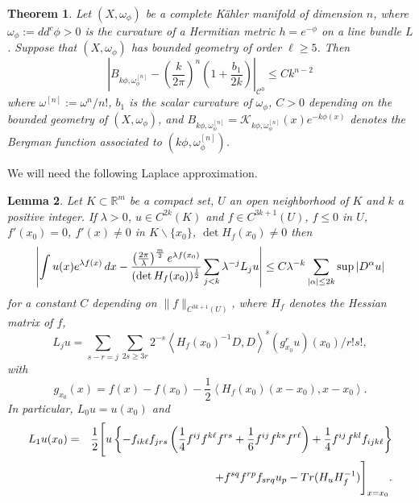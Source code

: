 \documentclass[a4paper, 11pt]{amsart}
\theoremstyle{plain}
\newtheorem{theorem}{Theorem}[section]
\numberwithin{equation}{section} %
\numberwithin{figure}{section} %
\theoremstyle{plain}
\theoremstyle{plain}
\theoremstyle{plain}
\theoremstyle{plain}
\newtheorem{lemma}[theorem]{Lemma} %
\theoremstyle{remark}
\theoremstyle{definition}
\theoremstyle{definition}
\newcommand{\K}{\mathcal{K}}
\begin{document}
\begin{theorem}\label{thm: Bergman} Let $(X, \omega_\phi)$ be a complete K\"ahler manifold of dimension $n$, where  $\omega_\phi:=dd^c\phi>0$ is the curvature of a  Hermitian metric $h=e^{-\phi}$ on a line bundle  $L$. 
Suppose that $(X,\omega_\phi)$ has bounded geometry of order $\ell\geq 5$. Then
$$\left|B_{k\phi, \omega_\phi^{[n]}} - \left(\frac{k}{2\pi} \right)^n  \left( 1+ \frac{b_1}{2k}\right)\right|_{\mathcal{C}^0} \leq Ck^{n-2}$$
where $\omega^{[n]}:=\omega^n/n!$, $b_1$ is the scalar curvature of $\omega_\phi$,   $C>0$ depending on the bounded geometry of $(X, \omega_\phi)$, and $B_{k\phi, \omega_\phi^{[n]}}=\K_{k\phi, \omega_\phi^{[n]}}(x)e^{-k\phi(x)} $ denotes the Bergman function associated to $(k\phi,\omega_\phi^{[n]})$.
\end{theorem}
We will need the following Laplace approximation.
\begin{lemma} \cite[Theorem 7.7.5]{Hormander-book-Analysis1}  \label{lem:Laplace}
Let $K\subset \mathbb{R}^{m}$
be a compact set, $U$ an open neighborhood of $K$ and $k$ a positive integer. If $\lambda>0$,  $u\in C^{2k}(K)$ and $f\in C^{3k+1}(U)$, $ f\leq 0$ in $U$, $f'(x_0)=0$, $f'(x)\neq 0$ in $K\backslash\{x_0\}$, $\det H_f(x_0)\neq 0
$ then 
\begin{eqnarray*}
\left|\int u(x) e^{\lambda f(x)}\, {\rm d}x - \frac{\left(\frac{2\pi }{\lambda}\right)^{\frac{m}{2}}e^{\lambda f(x_0)}}{(\det H_f(x_0))^{\frac{1}{2}}}   \sum_{j<k} \lambda^{-j} L_j u\right|\leq  C\lambda^{-k}\sum_{|\alpha|\leq 2k}\sup |D^\alpha u|
\end{eqnarray*}
for a constant $C$ depending on $\|f\|_{C^{3k+1}(U)}$, 
where $H_f$ denotes the Hessian matrix of $f$,
$$L_j u = \sum_{s-r=j} \sum_{2s\geq 3r} 2^{-s}  \left\langle H_f(x_0)^{-1}D,D\right \rangle^s (g^r_{x_0} u)(x_0)/r!s!,$$
with
$$ g_{x_0}(x)=f(x)-f(x_0) - \frac{1}{2}  \left\langle  H_f(x_0)(x-x_0), x-x_0 \right \rangle.$$ 
In particular, $L_0 u= u(x_0)$ and 
\begin{eqnarray*}
L_1 u(x_0) &=&\frac{1}{2} \Bigg[
 u \left\{ - f_{ik\ell}f_{jrs} \left(\frac{1}{4}f^{ij}f^{k\ell}f^{rs}   
+ \frac{1}{6} f^{ij}f^{ks}f^{r\ell} \right) +\frac{1}{4} f^{ij}f^{kl}f_{ijk\ell} \right\}\\
&& \quad + f^{sq} f^{rp}f_{srq} u_p 
- {\rm Tr}(H_u H_f^{-1}) \Bigg]_{x=x_0}.
\end{eqnarray*}
\end{lemma}
\end{document}
